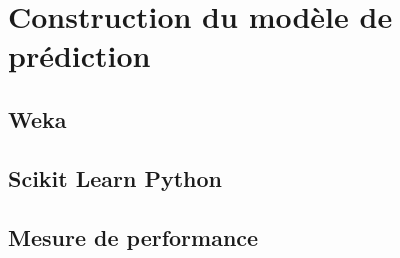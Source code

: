 \section{Construction du modèle de prédiction }

\subsection{Weka}
\subsection{Scikit Learn Python }

\subsection{Mesure de performance}




